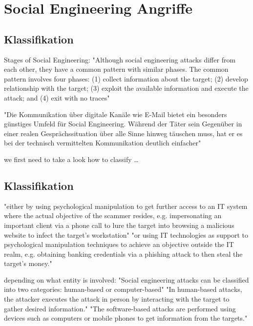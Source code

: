 \chapter{Social Engineering Angriffe}

\section{Klassifikation}

Stages of Social Engineering:
"Although social engineering attacks differ from each other, they have a common pattern with similar phases.
The common pattern involves four phases: (1) collect information about the target; (2) develop relationship with
the target; (3) exploit the available information and execute the attack; and (4) exit with no traces"\cite{4_mdpi}


"Die Kommunikation über digitale Kanäle wie E-Mail bietet ein besonders günstiges Umfeld für Social Engineering.
Während der Täter sein Gegenüber in einer realen Gesprächssituation über alle Sinne hinweg täuschen muss, hat er
es bei der technisch vermittelten Kommunikation deutlich einfacher"\cite{2_bsi}

we first need to take a look how to classify \dots



\section{Klassifikation}

"either by using psychological manipulation to get further access to an IT system where the actual objective of
the scammer resides, e.g. impersonating an important client via a phone call to lure the target into browsing a
malicious website to infect the target's workstation"\cite{1_enisa}
"or using IT technologies as support to psychological manipulation techniques to achieve an objective outside
the IT realm, e.g. obtaining banking credentials via a phishing attack to then steal the target's money."\cite{1_enisa}

depending on what entity is involved:
"Social engineering attacks can be classified into two categories: human-based or computer-based"\cite{4_mdpi}
"In human-based attacks, the attacker executes the attack in person by interacting with the target to gather desired information."\cite{4_mdpi}
"The software-based attacks are performed using devices such as computers or mobile phones to get information from the targets."\cite{4_mdpi}

